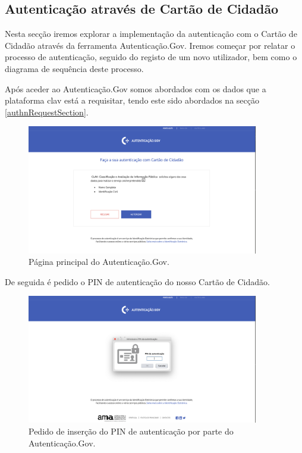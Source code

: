 \cleardoublepage
\subsection{Autenticação através de Cartão de Cidadão}

\vspace{-5mm}
Nesta secção iremos explorar a implementação da autenticação com o Cartão de Cidadão através da ferramenta Autenticação.Gov. Iremos começar por relatar o processo de autenticação, seguido do registo de um novo utilizador, bem como o diagrama de sequência deste processo.

Após aceder ao Autenticação.Gov somos abordados com os dados que a plataforma \gls{clav} está a requisitar, tendo este sido abordados na secção \ref{authnRequestSection}.

\vspace{-3mm}
\begin{figure}[H]
    \centering
    \includegraphics[width=0.9\textwidth]{img/clav/authCC/authgov1.png}
    \caption{Página principal do Autenticação.Gov.}
    \label{fig:landingPageAuthGov}
\end{figure}

\vspace{-3mm}
De seguida é pedido o PIN de autenticação do nosso Cartão de Cidadão.

\vspace{-3mm}
\begin{figure}[H]
    \centering
    \includegraphics[width=0.9\textwidth]{img/clav/authCC/authgov2.png}
    \caption{Pedido de inserção do PIN de autenticação por parte do Autenticação.Gov.}
    \label{fig:authGovPIN}
\end{figure}

